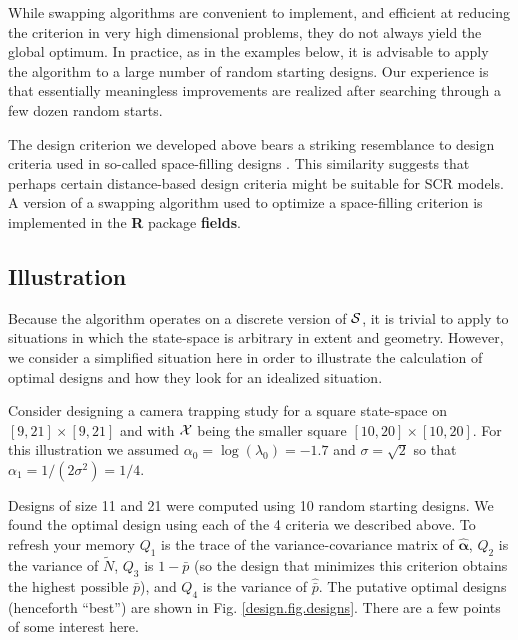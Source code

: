 While swapping algorithms are convenient to implement, and efficient
at reducing the criterion in very high dimensional problems, they do
not always yield the global optimum.  In practice, as in the examples
below, it is advisable to apply the algorithm to a large number of
random starting designs.  Our experience is that essentially
meaningless improvements are realized after searching through a few
dozen random starts.

The design criterion we developed above bears a striking resemblance
to design criteria used in so-called space-filling designs
\citep{nychka_etal:1997}.  This similarity suggests that perhaps
certain distance-based design criteria might be suitable for SCR
models. A version of a swapping algorithm used to
optimize a space-filling criterion is implemented in the {\bf R}
package {\bf fields}.


\subsection{Illustration}

Because the algorithm operates on a discrete version of ${\cal S}$,
it is trivial to apply to situations in which the
state-space is arbitrary in extent and geometry. However, we consider
a simplified situation here in order to illustrate the calculation of
optimal designs and how they look for an idealized situation.

Consider designing a camera trapping study for a square state-space on
$[9,21] \times [9, 21]$ and with ${\cal X}$ being the smaller square
$[10,20] \times [10,20]$.  For this illustration we assumed
$\alpha_{0} = \log(\lambda_{0}) = -1.7$ and $\sigma=\sqrt{2}$ so that
$\alpha_{1} = 1/(2\sigma^{2}) = 1/4$.

Designs of size 11 and 21 were computed using 10 random starting
designs.  We found the optimal design using each of the 4 criteria we
described above. To refresh your memory $Q_{1}$ is the trace of the
variance-covariance matrix of $\hat{\bm \alpha}$, $Q_{2}$ is the
variance of $\tilde{N}$, $Q_{3}$ is $1-\bar{p}$ (so the design that
minimizes this criterion obtains the highest possible $\bar{p}$), and
$Q_{4}$ is the variance of $\hat{\bar{p}}$.  The putative optimal
designs (henceforth ``best'') are shown in
Fig. \ref{design.fig.designs}. There are a few points of some interest
here.

